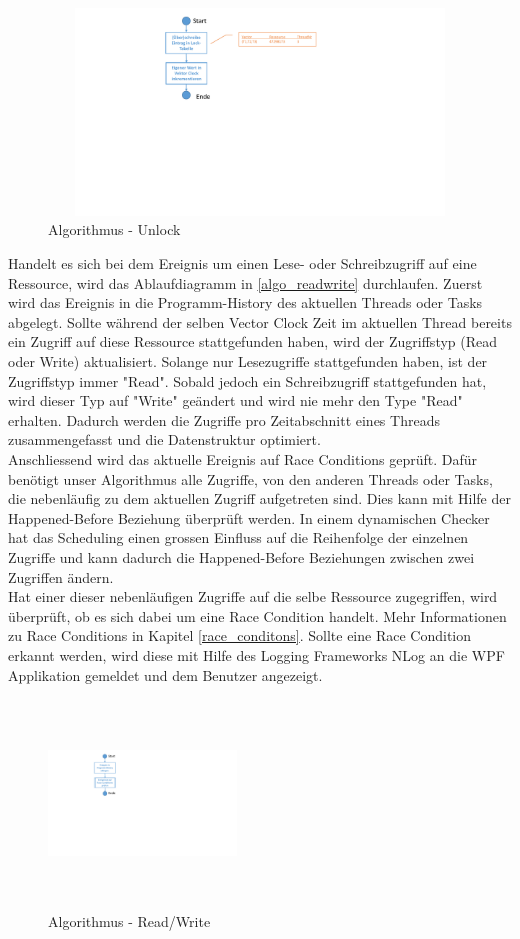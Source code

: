 \documentclass[10pt,a4paper]{article}
\begin{document}
\begin{flushleft}
\begin{figure}[H]
\centering
	\includegraphics[width=12cm,height=5.5cm,trim=70mm 106mm 100mm 8mm, clip]{images/Unlock.pdf}
\caption{Algorithmus - Unlock}\label{algo_unlock}
\end{figure}
Handelt es sich bei dem Ereignis um einen Lese- oder Schreibzugriff auf eine Ressource, wird das Ablaufdiagramm in \autoref{algo_readwrite} durchlaufen. Zuerst wird das Ereignis in die Programm-History des aktuellen Threads oder Tasks abgelegt. Sollte während der selben Vector Clock Zeit im aktuellen Thread bereits ein Zugriff auf diese Ressource stattgefunden haben, wird der Zugriffstyp (Read oder Write) aktualisiert. Solange nur Lesezugriffe stattgefunden haben, ist der Zugriffstyp immer "Read". Sobald jedoch ein Schreibzugriff stattgefunden hat, wird dieser Typ auf "Write" geändert und wird nie mehr den Type "Read" erhalten. Dadurch werden die Zugriffe pro Zeitabschnitt eines Threads zusammengefasst und die Datenstruktur optimiert.\\
Anschliessend wird das aktuelle Ereignis auf Race Conditions geprüft. Dafür benötigt unser Algorithmus alle Zugriffe, von den anderen Threads oder Tasks, die nebenläufig zu dem aktuellen Zugriff aufgetreten sind. Dies kann mit Hilfe der Happened-Before Beziehung überprüft werden. In einem dynamischen Checker hat das Scheduling einen grossen Einfluss auf die Reihenfolge der einzelnen Zugriffe und kann dadurch die Happened-Before Beziehungen zwischen zwei Zugriffen ändern.\\
Hat einer dieser nebenläufigen Zugriffe auf die selbe Ressource zugegriffen, wird überprüft, ob es sich dabei um eine Race Condition handelt. Mehr Informationen zu Race Conditions in Kapitel \ref{race_conditons}. Sollte eine Race Condition erkannt werden, wird diese mit Hilfe des Logging Frameworks NLog an die WPF Applikation gemeldet und dem Benutzer angezeigt.
\begin{figure}[H]
\centering
	\includegraphics[width=5cm,height=5.5cm,trim=70mm 108mm 200mm 7mm, clip]{images/ReadWrite.pdf}
\caption{Algorithmus - Read/Write}\label{algo_readwrite}
\end{figure}
\end{flushleft}
\end{document}
